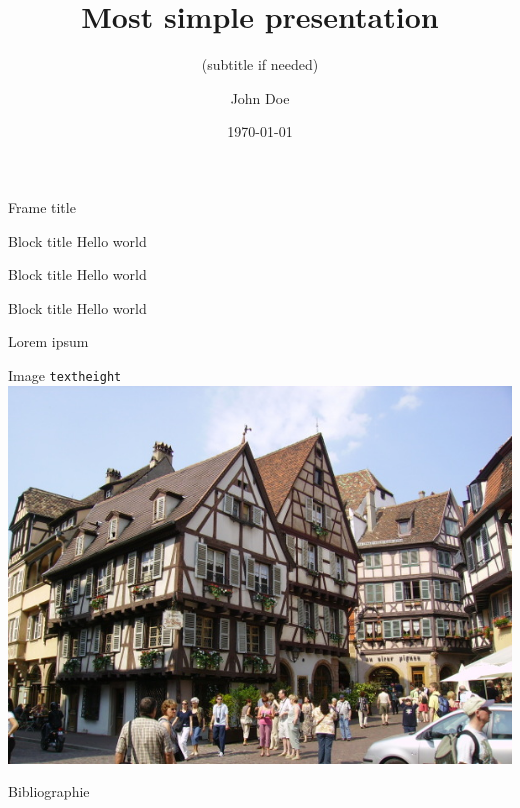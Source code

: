 \documentclass[aspectratio=169]{beamer}
\title{Most simple presentation}
\subtitle{(subtitle if needed)}
\author{John Doe}
\institute{ENSTA Bretagne}
\date{\today}
\begin{document}
{
	\begin{frame}[plain]
	\maketitle
	\end{frame}
}

\begin{frame}{Frame title}
\begin{exampleblock}{Block title}
Hello world
\end{exampleblock}
\begin{block}{Block title}
Hello world 
\end{block}
\begin{alertblock}{Block title}
Hello world \cite{Feynman1941}
\end{alertblock}
\end{frame}
\begin{frame}[allowframebreaks]{Lorem ipsum}
\lipsum[1-3]
\end{frame}
\begin{frame}{Image \texttt{textheight}}
\centering
\includegraphics[height=.985\textheight]{images/architecturebretonne_wikipedia.jpg}
\end{frame}
\begin{frame}{Bibliographie}
\printbibliography
\end{frame}
\end{document}
